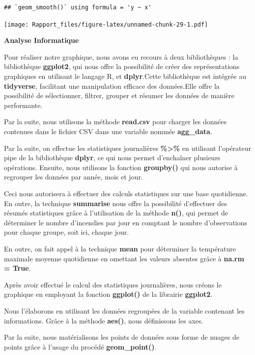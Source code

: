 \documentclass[
]{article}
\begin{document}
\begin{verbatim}
## `geom_smooth()` using formula = 'y ~ x'
\end{verbatim}

\texttt{[image: Rapport\_files/figure-latex/unnamed-chunk-29-1.pdf]}

\textbf{Analyse Informatique}

Pour réaliser notre graphique, nous avons eu recours à deux
bibliothèques : la bibliothèque \textbf{ggplot2}, qui nous offre la
possibilité de créer des représentations graphiques en utilisant le
langage R, et \textbf{dplyr}.Cette bibliothèque est intégrée au
\textbf{tidyverse}, facilitant une manipulation efficace des
données.Elle offre la possibilité de sélectionner, filtrer, grouper et
résumer les données de manière performante.

Par la suite, nous utilisons la méthode \textbf{read.csv} pour charger
les données contenues dans le fichier CSV dans une variable nommée
\textbf{agg\_data}.

Par la suite, on effectue les statistiques journalières
\textbf{\%\textgreater\%} en utilisant l'opérateur pipe de la
bibliothèque \textbf{dplyr}, ce qui nous permet d'enchaîner plusieurs
opérations. Ensuite, nous utilisons la fonction \textbf{groupby()} qui
nous autorise à regrouper les données par année, mois et jour.

Ceci nous autorisera à effectuer des calculs statistiques sur une base
quotidienne. En outre, la technique \textbf{summarise} nous offre la
possibilité d'effectuer des résumés statistiques grâce à l'utilisation
de la méthode \textbf{n()}, qui permet de déterminer le nombre
d'incendies par jour en comptant le nombre d'observations pour chaque
groupe, soit ici, chaque jour.

En outre, on fait appel à la technique \textbf{mean} pour déterminer la
température maximale moyenne quotidienne en omettant les valeurs
absentes grâce à \textbf{na.rm = True}.

Après avoir effectué le calcul des statistiques journalières, nous
créons le graphique en employant la fonction \textbf{ggplot()} de la
librairie \textbf{ggplot2}.

Nous l'élaborons en utilisant les données regroupées de la variable
contenant les informations. Grâce à la méthode \textbf{aes()}, nous
définissons les axes.

Par la suite, nous matérialisons les points de données sous forme de
nuages de points grâce à l'usage du procédé \textbf{geom\_point()}.
\end{document}
